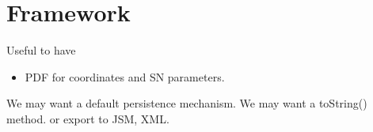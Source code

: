 \documentclass[preprint]{aastex}
\begin{document}
\section{Framework}
Useful to have
\begin{itemize}
\item PDF for coordinates and SN parameters.
\end{itemize}

We may want a default persistence mechanism.  We may want a toString() method. or export
to JSM, XML.

\begin{comment}
\subsection{}
\begin{enumerate}
\item Configuration controllable at the top-level executable:  The supernova realizer
will be used within 
\item SED
\item Supernova
\item Supernova Model
\item Realization from pdf
\end{enumerate}

The following are functionality and design choices that we anticipate wanting for the realizer:
\begin{itemize}
\item Supernovae provided through an iterator.
\item Access to a supernova through descriptor. 
\item Common descriptor for all objects with common deterministic behavior.
\item Immutable.
\end{itemize}

\subsection{Registry Implementation}
There is a registry which provides access to supernova realizer.

There is only one registry object, otherwise there is ambiguity.
\begin{verbatim}
class Registry
    Map registry              // map between String and realizer objects
    register(String)            // registers a new realizer
    getRegister(String)     // return selected register
    init()                       // initialize Map with official and user-supplied registers
\end{verbatim}

Each Realizer to be registered must satisfy the interface
\begin{verbatim}
interface Register
    String getName()     // the official name, also used in the Registry Map
\end{verbatim}
	

\end{comment}
\end{document}
